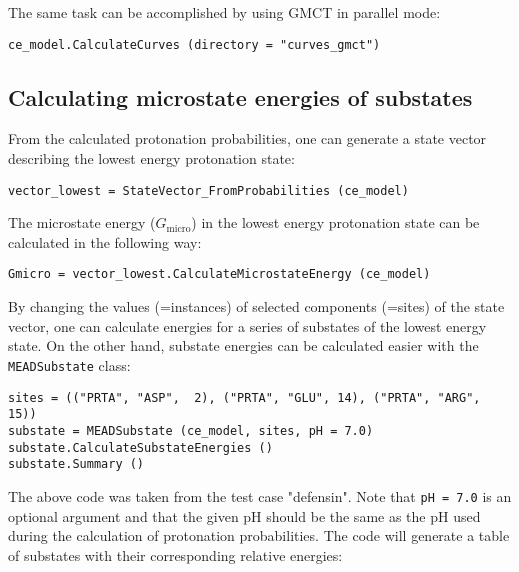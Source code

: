 \documentclass[a4paper,11pt]{article}
\begin{document}
{\bigskip
The same task can be accomplished by using GMCT in parallel mode:

{\footnotesize \begin{lstlisting}
ce_model.CalculateCurves (directory = "curves_gmct")
\end{lstlisting} }


\subsection{Calculating microstate energies of substates}
From the calculated protonation probabilities, one can generate a state vector describing
the lowest energy protonation state:

{\footnotesize \begin{lstlisting}
vector_lowest = StateVector_FromProbabilities (ce_model)
\end{lstlisting} }

\bigskip
The microstate energy ($G_{\mathrm{micro}}$) in the lowest energy protonation state can 
be calculated in the following way:

{\footnotesize \begin{lstlisting}
Gmicro = vector_lowest.CalculateMicrostateEnergy (ce_model)
\end{lstlisting} }

\bigskip
By changing the values (=instances) of selected components (=sites) of the state vector, 
one can calculate energies for a series of substates of the lowest energy state.
%
On the other hand, substate energies can be calculated easier with the \texttt{MEADSubstate} class:

{\footnotesize \begin{lstlisting}
sites = (("PRTA", "ASP",  2), ("PRTA", "GLU", 14), ("PRTA", "ARG", 15))
substate = MEADSubstate (ce_model, sites, pH = 7.0)
substate.CalculateSubstateEnergies ()
substate.Summary ()
\end{lstlisting} }

\bigskip
The above code was taken from the test case "defensin".
%
Note that \texttt{pH = 7.0} is an optional argument and that the given pH should be the same
as the pH used during the calculation of protonation probabilities.
%
The code will generate a table of substates with their corresponding relative energies:

}
\end{document}
